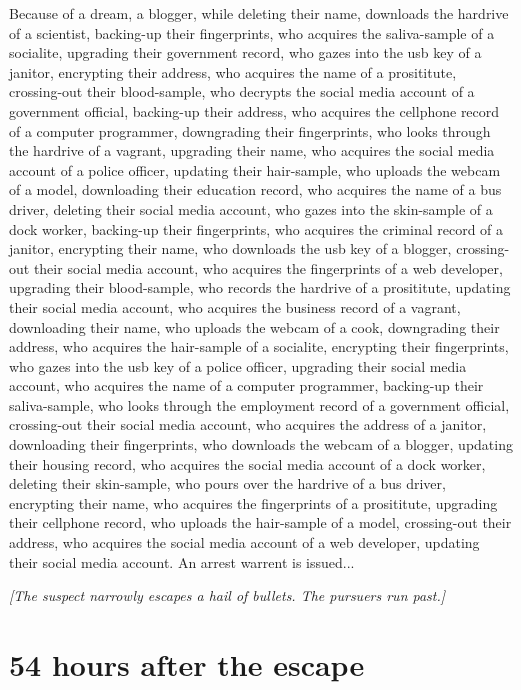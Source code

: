 \documentclass{report}
\begin{document}
Because of a dream, a blogger, while deleting their name, downloads the hardrive of a scientist, backing-up their fingerprints, who acquires the saliva-sample of a socialite, upgrading their government record, who gazes into the usb key of a janitor, encrypting their address, who acquires the name of a prosititute, crossing-out their blood-sample, who decrypts the social media account of a government official, backing-up their address, who acquires the cellphone record of a computer programmer, downgrading their fingerprints, who looks through the hardrive of a vagrant, upgrading their name, who acquires the social media account of a police officer, updating their hair-sample, who uploads the webcam of a model, downloading their education record, who acquires the name of a bus driver, deleting their social media account, who gazes into the skin-sample of a dock worker, backing-up their fingerprints, who acquires the criminal record of a janitor, encrypting their name, who downloads the usb key of a blogger, crossing-out their social media account, who acquires the fingerprints of a web developer, upgrading their blood-sample, who records the hardrive of a prosititute, updating their social media account, who acquires the business record of a vagrant, downloading their name, who uploads the webcam of a cook, downgrading their address, who acquires the hair-sample of a socialite, encrypting their fingerprints, who gazes into the usb key of a police officer, upgrading their social media account, who acquires the name of a computer programmer, backing-up their saliva-sample, who looks through the employment record of a government official, crossing-out their social media account, who acquires the address of a janitor, downloading their fingerprints, who downloads the webcam of a blogger, updating their housing record, who acquires the social media account of a dock worker, deleting their skin-sample, who pours over the hardrive of a bus driver, encrypting their name, who acquires the fingerprints of a prosititute, upgrading their cellphone record, who uploads the hair-sample of a model, crossing-out their address, who acquires the social media account of a web developer, updating their social media account. An arrest warrent is issued...

\textit{[The suspect narrowly escapes a hail of bullets. The pursuers run past.]}


\section*{54 \small{hours after the escape}}
\end{document}
